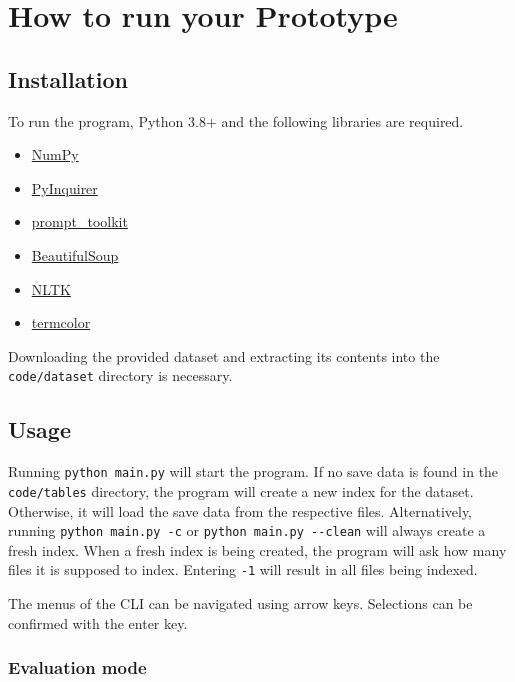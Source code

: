 \section{How to run your Prototype}
\label{sec:guide}

\subsection{Installation}

To run the program, Python 3.8+ and the following libraries are required.

\begin{itemize}
  \item \href{https://numpy.org}{NumPy}
  \item \href{https://github.com/CITGuru/PyInquirer}{PyInquirer}
  \item \href{https://github.com/prompt-toolkit/python-prompt-toolkit}{prompt\_toolkit}
  \item \href{https://www.crummy.com/software/BeautifulSoup/bs4/doc/}{BeautifulSoup}
  \item \href{https://www.nltk.org}{NLTK}
  \item \href{https://pypi.org/project/termcolor/}{termcolor}
\end{itemize}

Downloading the provided dataset and extracting its contents into the \verb|code/dataset| directory is necessary.

\subsection{Usage}

Running \verb|python main.py| will start the program.
If no save data is found in the \verb|code/tables| directory, the program will create a new index for the dataset.
Otherwise, it will load the save data from the respective files.
Alternatively, running \verb|python main.py -c| or \verb|python main.py --clean| will always create a fresh index.
When a fresh index is being created, the program will ask how many files it is supposed to index.
Entering \verb|-1| will result in all files being indexed.

The menus of the CLI can be navigated using arrow keys.
Selections can be confirmed with the enter key.

\subsubsection{Evaluation mode}

